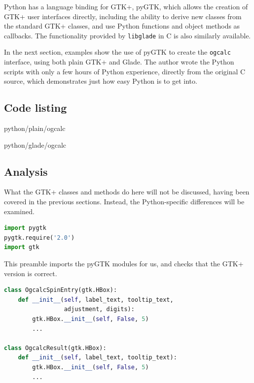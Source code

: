 \documentclass[a4paper,oneside]{article}
\newcommand{\filename}[1]{\texttt{#1}}
\newcommand{\program}[1]{\texttt{#1}}
\begin{document}
Python has a language binding for GTK+, pyGTK, which allows the
creation of GTK+ user interfaces directly, including the ability to
derive new classes from the standard GTK+ classes, and use Python
functions and object methods as callbacks.  The functionality
provided by \program{libglade} in C is also similarly available.

In the next section, examples show the use of pyGTK to create the
\program{ogcalc} interface, using both plain GTK+ and Glade.
The author wrote the Python scripts with only a few hours of Python
experience, directly from the original C source, which demonstrates
just how easy Python is to get into.

\subsection{Code listing}


                 {python/plain/ogcalc}


                 {python/glade/ogcalc}

\subsection{Analysis}

What the GTK+ classes and methods do here will not be discussed,
having been covered in the previous sections.  Instead, the
Python-specific differences will be examined.

\begin{lstlisting}[numbers=none, language=Python]
import pygtk
pygtk.require('2.0')
import gtk
\end{lstlisting}

This preamble imports the pyGTK modules for us, and checks that the
GTK+ version is correct.

\begin{lstlisting}[numbers=none, language=Python]
class OgcalcSpinEntry(gtk.HBox):
    def __init__(self, label_text, tooltip_text,
                 adjustment, digits):
        gtk.HBox.__init__(self, False, 5)
        ...

class OgcalcResult(gtk.HBox):
    def __init__(self, label_text, tooltip_text):
        gtk.HBox.__init__(self, False, 5)
        ...
\end{lstlisting}
\end{document}
